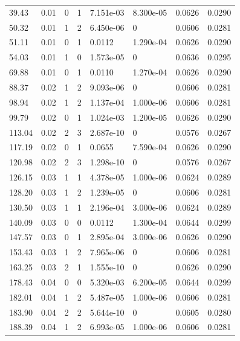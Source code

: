 \documentclass[preview]{standalone}
\begin{document}
{{\begin{tabular}{L{1.2cm}C{1.2cm} C{0.3cm}C{0.5cm} C{1.4cm}C{1.4cm} C{1.4cm}C{1.4cm}}
  39.43  &  0.01  & 0     &  1 &  7.151e-03  & 8.300e-05  & 0.0626 &  0.0290   \\ 
  50.32  &  0.01  & 1     &  2 &  6.450e-06  & 0  & 0.0606 &  0.0281   \\ 
  51.11  &  0.01  & 0     &  1 &  0.0112  & 1.290e-04  & 0.0626 &  0.0290   \\ 
  54.03  &  0.01  & 1     &  0 &  1.573e-05  & 0  & 0.0636 &  0.0295   \\ 
  69.88  &  0.01  & 0     &  1 &  0.0110  & 1.270e-04  & 0.0626 &  0.0290   \\ 
  88.37  &  0.02  & 1     &  2 &  9.093e-06  & 0  & 0.0606 &  0.0281   \\ 
  98.94  &  0.02  & 1     &  2 &  1.137e-04  & 1.000e-06  & 0.0606 &  0.0281   \\ 
  99.79  &  0.02  & 0     &  1 &  1.024e-03  & 1.200e-05  & 0.0626 &  0.0290   \\ 
  113.04  &  0.02  & 2     &  3 &  2.687e-10  & 0  & 0.0576 &  0.0267   \\ 
  117.19  &  0.02  & 0     &  1 &  0.0655  & 7.590e-04  & 0.0626 &  0.0290   \\ 
  120.98  &  0.02  & 2     &  3 &  1.298e-10  & 0  & 0.0576 &  0.0267   \\ 
  126.15  &  0.03  & 1     &  1 &  4.378e-05  & 1.000e-06  & 0.0624 &  0.0289   \\ 
  128.20  &  0.03  & 1     &  2 &  1.239e-05  & 0  & 0.0606 &  0.0281   \\ 
  130.50  &  0.03  & 1     &  1 &  2.196e-04  & 3.000e-06  & 0.0624 &  0.0289   \\ 
  140.09  &  0.03  & 0     &  0 &  0.0112  & 1.300e-04  & 0.0644 &  0.0299   \\ 
  147.57  &  0.03  & 0     &  1 &  2.895e-04  & 3.000e-06  & 0.0626 &  0.0290   \\ 
  153.43  &  0.03  & 1     &  2 &  7.965e-06  & 0  & 0.0606 &  0.0281   \\ 
  163.25  &  0.03  & 2     &  1 &  1.555e-10  & 0  & 0.0626 &  0.0290   \\ 
  178.43  &  0.04  & 0     &  0 &  5.320e-03  & 6.200e-05  & 0.0644 &  0.0299   \\ 
  182.01  &  0.04  & 1     &  2 &  5.487e-05  & 1.000e-06  & 0.0606 &  0.0281   \\ 
  183.90  &  0.04  & 2     &  2 &  5.644e-10  & 0  & 0.0605 &  0.0280   \\ 
  188.39  &  0.04  & 1     &  2 &  6.993e-05  & 1.000e-06  & 0.0606 &  0.0281   \\ 

\end{tabular}}}
\end{document}
